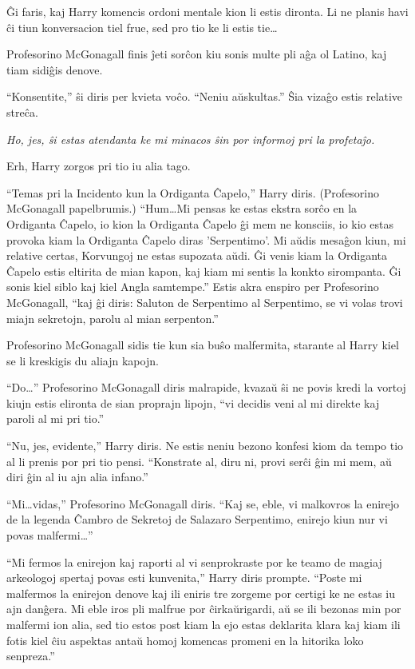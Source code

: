 Ĝi faris, kaj Harry komencis ordoni mentale kion li estis dironta. Li
ne planis havi ĉi tiun konversacion tiel frue, sed pro tio ke li estis
tie\ldots

Profesorino McGonagall finis ĵeti sorĉon kiu sonis multe pli aĝa ol
Latino, kaj tiam sidiĝis denove.

``Konsentite,'' ŝi diris per kvieta voĉo. ``Neniu aŭskultas.'' Ŝia
vizaĝo estis relative streĉa.

\emph{Ho, jes, ŝi estas atendanta ke mi minacos ŝin por informoj pri la profetaĵo.}

Erh, Harry zorgos pri tio iu alia tago.

``Temas pri la Incidento kun la Ordiganta Ĉapelo,'' Harry
diris. (Profesorino McGonagall papelbrumis.) ``Hum\ldots Mi pensas ke
estas ekstra sorĉo en la Ordiganta Ĉapelo, io kion la Ordiganta Ĉapelo
ĝi mem ne konsciis, io kio estas provoka kiam la Ordiganta Ĉapelo
diras 'Serpentimo'. Mi aŭdis mesaĝon kiun, mi relative certas,
Korvungoj ne estas supozata aŭdi.  Ĝi venis kiam la Ordiganta Ĉapelo
estis eltirita de mian kapon, kaj kiam mi sentis la konkto
sirompanta. Ĝi sonis kiel siblo kaj kiel Angla samtempe.'' Estis akra
enspiro per Profesorino McGonagall, ``kaj ĝi diris: Saluton de
Serpentimo al Serpentimo, se vi volas trovi miajn sekretojn, parolu al
mian serpenton.''

Profesorino McGonagall sidis tie kun sia buŝo malfermita, starante al
Harry kiel se li kreskigis du aliajn kapojn.

``Do\ldots'' Profesorino McGonagall diris malrapide, kvazaŭ ŝi ne
povis kredi la vortoj kiujn estis elironta de sian proprajn lipojn,
``vi decidis veni al mi direkte kaj paroli al mi pri tio.''

``Nu, jes, evidente,'' Harry diris. Ne estis neniu bezono konfesi kiom
da tempo tio al li prenis por pri tio pensi. ``Konstrate al, diru ni,
provi serĉi ĝin mi mem, aŭ diri ĝin al iu ajn alia infano.'' 

``Mi\ldots vidas,'' Profesorino McGonagall diris. ``Kaj se, eble, vi
malkovros la enirejo de la legenda Ĉambro de Sekretoj de Salazaro
Serpentimo, enirejo kiun nur vi povas malfermi\ldots''

``Mi fermos la enirejon kaj raporti al vi senprokraste por ke teamo de
magiaj arkeologoj spertaj povas esti kunvenita,'' Harry diris
prompte. ``Poste mi malfermos la enirejon denove kaj ili eniris tre
zorgeme por certigi ke ne estas iu ajn danĝera. Mi eble iros pli
malfrue por ĉirkaŭrigardi, aŭ se ili bezonas min por malfermi ion alia,
sed tio estos post kiam la ejo estas deklarita klara kaj kiam ili
fotis kiel ĉiu aspektas antaŭ homoj komencas promeni en la hitorika
loko senpreza.''

